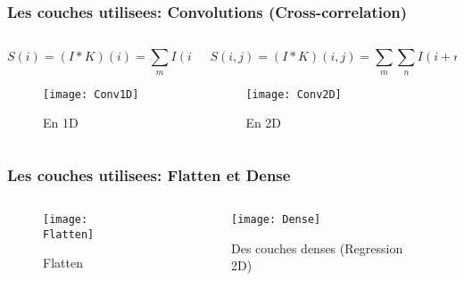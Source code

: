 \begin{frame}
    \frametitle{Les couches utilisees: Convolutions (Cross-correlation)}
    \begin{columns}
        \begin{column}{0.4\textwidth}
            \scriptsize
            \begin{equation*}
                S(i) = (I * K)(i) = \sum_{m} I(i+m)K(m)
                \label{eqn:Corr2D}
            \end{equation*}
            \begin{figure}
                \texttt{[image: Conv1D]}
                \caption{En 1D \parencite{Reference10}}
            \end{figure}
        \end{column}
        \begin{column}{0.6\textwidth}
            \scriptsize
            \begin{equation*}
                S(i,j) = (I * K)(i,j) = \sum_{m}\sum_{n} I(i+m,j+n)K(m,n)
                \label{eqn:Corr2D}
            \end{equation*}
            \begin{figure}
                \texttt{[image: Conv2D]}
                \caption{En 2D \parencite{Reference11}}
            \end{figure}
        \end{column}
    \end{columns}
\end{frame}

\begin{frame}
    \frametitle{Les couches utilisees: Flatten et Dense}
    \begin{columns}
        \begin{column}{0.4\textwidth}
            \begin{figure}
                \texttt{[image: Flatten]}
                \caption{Flatten}
            \end{figure}
        \end{column}
        \begin{column}{0.6\textwidth}
            \begin{figure}
                \texttt{[image: Dense]}
                \caption{Des couches denses (Regression 2D)}
            \end{figure}
        \end{column}
    \end{columns}
\end{frame}


